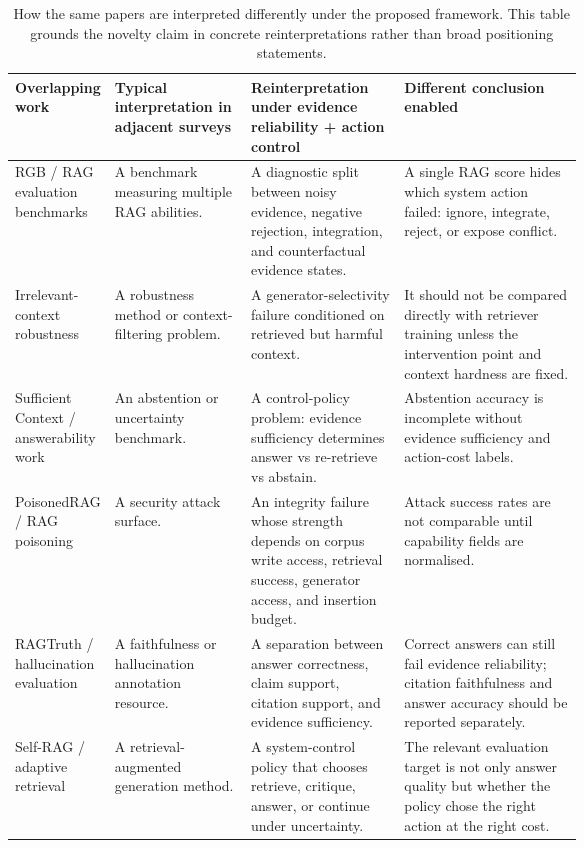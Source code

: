 \begin{table}[t]
\centering
\scriptsize
\renewcommand{\arraystretch}{0.9}
\begin{tabularx}{\linewidth}{>{\raggedright\arraybackslash}p{0.15\linewidth}>{\raggedright\arraybackslash}p{0.24\linewidth}>{\raggedright\arraybackslash}p{0.27\linewidth}X}
\toprule
\textbf{Overlapping work} & \textbf{Typical interpretation in adjacent surveys} & \textbf{Reinterpretation under evidence reliability + action control} & \textbf{Different conclusion enabled} \\
\midrule
RGB / RAG evaluation benchmarks & A benchmark measuring multiple RAG abilities. & A diagnostic split between noisy evidence, negative rejection, integration, and counterfactual evidence states. & A single RAG score hides which system action failed: ignore, integrate, reject, or expose conflict. \\
Irrelevant-context robustness & A robustness method or context-filtering problem. & A generator-selectivity failure conditioned on retrieved but harmful context. & It should not be compared directly with retriever training unless the intervention point and context hardness are fixed. \\
Sufficient Context / answerability work & An abstention or uncertainty benchmark. & A control-policy problem: evidence sufficiency determines answer vs re-retrieve vs abstain. & Abstention accuracy is incomplete without evidence sufficiency and action-cost labels. \\
PoisonedRAG / RAG poisoning & A security attack surface. & An integrity failure whose strength depends on corpus write access, retrieval success, generator access, and insertion budget. & Attack success rates are not comparable until capability fields are normalised. \\
RAGTruth / hallucination evaluation & A faithfulness or hallucination annotation resource. & A separation between answer correctness, claim support, citation support, and evidence sufficiency. & Correct answers can still fail evidence reliability; citation faithfulness and answer accuracy should be reported separately. \\
Self-RAG / adaptive retrieval & A retrieval-augmented generation method. & A system-control policy that chooses retrieve, critique, answer, or continue under uncertainty. & The relevant evaluation target is not only answer quality but whether the policy chose the right action at the right cost. \\
\bottomrule
\end{tabularx}
\caption{How the same papers are interpreted differently under the proposed framework. This table grounds the novelty claim in concrete reinterpretations rather than broad positioning statements.}
\label{tab:overlap-reinterpretation}
\end{table}

